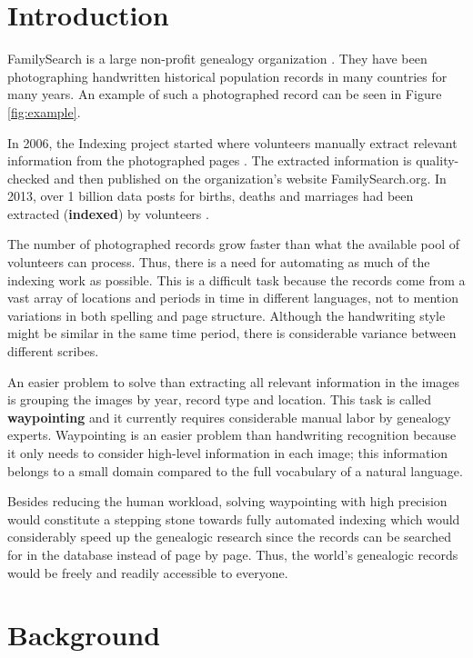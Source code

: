 
\section{Introduction}

FamilySearch is a large non-profit genealogy organization \cite{FamilySearchAbout}. They have been photographing handwritten historical population records in many countries for many years. An example of such a photographed record can be seen in Figure \ref{fig:example}.

In 2006, the Indexing project started where volunteers manually extract relevant information from the photographed pages \cite{Indexing}. The extracted information is quality-checked and then published on the organization's website FamilySearch.org. In 2013, over 1 billion data posts for births, deaths and marriages had been extracted (\textbf{indexed}) by volunteers \cite{Billion}.

The number of photographed records grow faster than what the available pool of volunteers can process. Thus, there is a need for automating as much of the indexing work as possible. This is a difficult task because the records come from a vast array of locations and periods in time in different languages, not to mention variations in both spelling and page structure. Although the handwriting style might be similar in the same time period, there is considerable variance between different scribes.

An easier problem to solve than extracting all relevant information in the images is grouping the images by year, record type and location. This task is called \textbf{waypointing} \cite{Waypointing} and it currently requires considerable manual labor by genealogy experts.
Waypointing is an easier problem than handwriting recognition because it only needs to consider high-level information in each image; this information belongs to a small domain compared to the full vocabulary of a natural language.

Besides reducing the human workload, solving waypointing with high precision would constitute a stepping stone towards fully automated indexing which would considerably speed up the genealogic research since the records can be searched for in the database instead of page by page. Thus, the world's genealogic records would be freely and readily accessible to everyone.


\section{Background}

